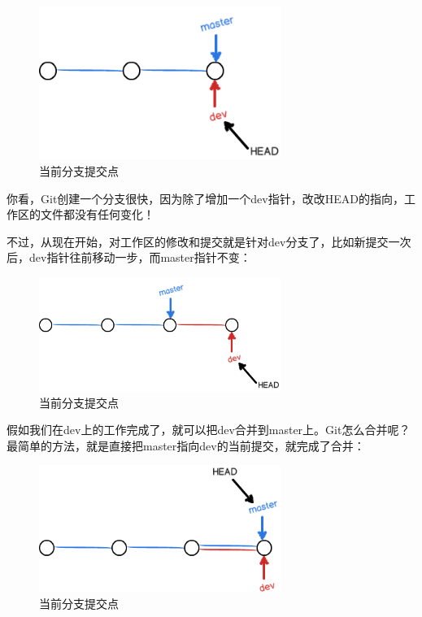 \begin{figure}[h]
  \centering
  \includegraphics[width=0.7\textwidth]{img/git-br-create.png}
  \caption{当前分支提交点}
  \label{fig:git-br-create}
\end{figure}

你看，Git创建一个分支很快，因为除了增加一个dev指针，改改HEAD的指向，工作区的文件都没有任何变化！

不过，从现在开始，对工作区的修改和提交就是针对dev分支了，比如新提交一次后，dev指针往前移动一步，而master指针不变：

\begin{figure}[h]
  \centering
  \includegraphics[width=0.7\textwidth]{img/git-br-dev-fd.png}
  \caption{当前分支提交点}
  \label{fig:git-br-dev-fd}
\end{figure}


假如我们在dev上的工作完成了，就可以把dev合并到master上。Git怎么合并呢？最简单的方法，就是直接把master指向dev的当前提交，就完成了合并：

\begin{figure}[h]
  \centering
  \includegraphics[width=0.7\textwidth]{img/git-br-ff-merge.png}
  \caption{当前分支提交点}
  \label{fig:git-br-ff-merge}
\end{figure}

